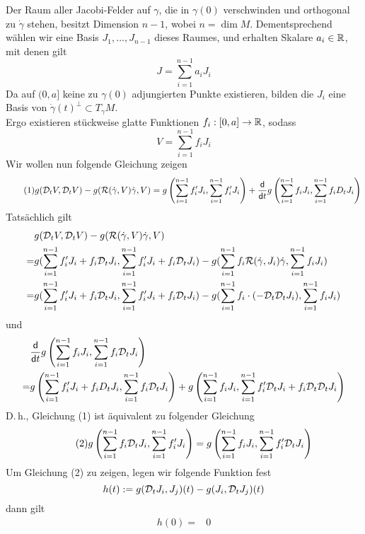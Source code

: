 \documentclass{book}
\renewcommand{\d}{\textsf{d}}
\newcommand{\Rc}{\mathcal{R}}
\begin{document}
\begin{Beweis}{}
Der Raum aller Jacobi-Felder auf $\gamma$, die in $\gamma(0)$ verschwinden und orthogonal zu $\dot{\gamma}$ stehen, besitzt Dimension $n-1$, wobei $n = \dim M$. Dementsprechend wählen wir eine Basis $J_1,\ldots, J_{n-1}$ dieses Raumes, und erhalten Skalare $a_i \in \mathbb{R}$, mit denen gilt
\[ J = \sum_{i = 1}^{n-1} a_i J_i \]
Da auf $(0,a]$ keine zu $\gamma(0)$ adjungierten Punkte existieren, bilden die $J_i$ eine Basis von $\dot{\gamma}(t)^\bot \subset T_\gamma M$.\\
Ergo existieren stückweise glatte Funktionen $f_i : [0,a] \overset{}{\rightarrow} \mathbb{R}$, sodass
\[ V = \sum_{i = 1}^{n-1}f_i J_i \]
Wir wollen nun folgende Gleichung zeigen
\begin{align*}
\tag{1}
g(\D_tV, \D_tV) - g(\Rc(\dot{\gamma}, V)\dot{\gamma}, V) 
=
g\klam{ \sum_{i = 1}^{n-1} f_i' J_i, \sum_{i = 1}^{n-1} f_i' J_i }
+ \frac{\d}{\d t} g
\klam{ \sum_{i = 1}^{n-1} f_i J_i, \sum_{i = 1}^{n - 1} f_i D_tJ_i }
\end{align*}
Tatsächlich gilt
\begin{align*}
& g(\D_tV, \D_tV) - g(\Rc(\dot{\gamma}, V)\dot{\gamma}, V) \\
=&
g( \sum_{i = 1}^{n-1} f_i'J_i + f_i\D_tJ_i, \sum_{i = 1}^{n-1} f_i'J_i + f_i\D_tJ_i )
-
g(\sum_{i=1}^{n-1} f_i \Rc(\dot{\gamma}, J_i)\dot{\gamma}, \sum_{i = 1}^{n-1}f_i J_i )\\
=& g( \sum_{i = 1}^{n-1} f_i'J_i + f_i\D_tJ_i, \sum_{i = 1}^{n-1} f_i'J_i + f_i\D_tJ_i )
-
g(\sum_{i=1}^{n-1} f_i \cdot (-\D_t\D_t J_i), \sum_{i = 1}^{n-1}f_i J_i )
\end{align*}
und
\begin{align*}
& \frac{\d}{\d t} g \klam{ \sum_{i=1}^{n-1} f_i J_i, \sum_{i = 1}^{n-1} f_i \D_t J_i }\\
= & g \klam{ \sum_{i=1}^{n-1} f_i' J_i + f_i D_t J_i, \sum_{i = 1}^{n-1} f_i \D_t J_i }
+g \klam{ \sum_{i=1}^{n-1} f_i J_i, \sum_{i = 1}^{n-1} f_i' \D_t J_i + f_i \D_t\D_t J_i }
\end{align*}
D.\,h., Gleichung (1) ist äquivalent zu folgender Gleichung
\begin{align*}
\tag{2}
g\left(\sum_{i = 1}^{n-1} f_i \mathcal{D}_t J_i, \sum_{i = 1}^{n-1} f_i' J_i\right) 
= 
g\left(\sum_{i = 1}^{n-1} f_i J_i , \sum_{i = 1}^{n-1} f_i' \mathcal{D}_t J_i \right)
\end{align*}
Um Gleichung (2) zu zeigen, legen wir folgende Funktion fest
\[ h(t) := g(\mathcal{D}_t J_i, J_j)(t) - g(J_i, \mathcal{D}_t J_j)(t) \]
dann gilt
\begin{align*}
h(0) =& 0\\

\end{align*}
\end{Beweis}
\end{document}
